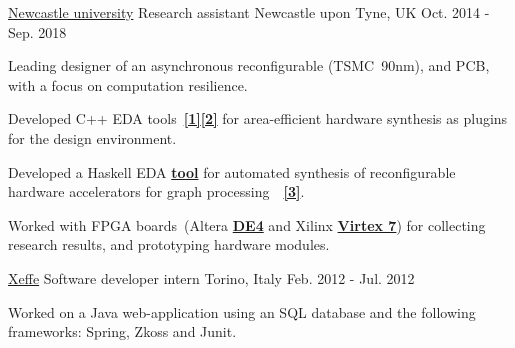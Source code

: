
\begin{cventries}

\cventry
{\href{https://www.ncl.ac.uk/}{\color{myblue}Newcastle university}}
{Research assistant} %
{Newcastle upon Tyne, UK} %
{Oct. 2014 - Sep. 2018} %
{ 
\begin{cvitems}
\item {Leading designer of an asynchronous reconfigurable
\href{https://ieeexplore.ieee.org/document/8342264/}{}
(TSMC~90nm), and PCB, with a focus on computation resilience.}
\item {Developed C++ EDA
tools~{\color{myblue}\href{https://github.com/tuura/shutters}{\textbf{[1]}}}{\color{myblue}\href{https://github.com/tuura/scenco}{\textbf{[2]}}}
for area-efficient hardware synthesis as plugins for the
\href{https://workcraft.org/}{}
design environment.}
\item {Developed a Haskell EDA 
{\color{myblue}\href{https://github.com/tuura/fantasi/tree/master/doc}{\textbf{tool}}}
for automated synthesis of reconfigurable hardware accelerators for graph
processing~~{\color{myblue}\href{https://poets-project.org/publications}{\textbf{[3]}}}.}
\item {Worked with FPGA boards~(Altera 
{\color{myblue}\href{https://www.altera.com/solutions/partners/partner-profile/terasic-inc-/board/de4-stratix-iv-development-board.html\#overview}{\textbf{DE4}}}
and Xilinx 
{\color{myblue}\href{https://www.xilinx.com/products/boards-and-kits/ek-v7-vc707-g.html}{\textbf{Virtex
 7}}}) for collecting research results, and prototyping hardware modules.}
\end{cvitems}
}


\cventry
{\color{myblue}\href{http://www.xeffe.it/}{Xeffe}}
{Software developer intern}
{Torino, Italy}
{Feb. 2012 - Jul. 2012}
{
\begin{cvitems}
Worked on a Java web-application using an SQL database and 
the following frameworks: Spring, Zkoss and Junit.
\end{cvitems}
}


\end{cventries}
\vspace{-1mm}